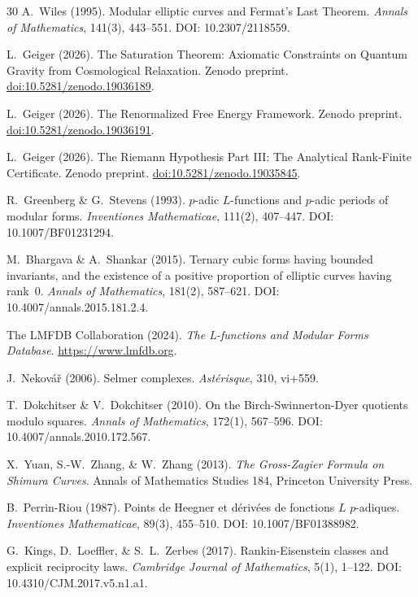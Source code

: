 \documentclass[aps,prd,twocolumn,superscriptaddress,nofootinbib]{revtex4-2}
\theoremstyle{definition}
\theoremstyle{remark}
\begin{document}
\begin{thebibliography}{30}
A.~Wiles (1995).
Modular elliptic curves and Fermat's Last Theorem.
\textit{Annals of Mathematics}, 141(3), 443--551.
DOI: 10.2307/2118559.

L.~Geiger (2026).
The Saturation Theorem: Axiomatic Constraints on Quantum Gravity from Cosmological Relaxation.
Zenodo preprint.
\href{https://doi.org/10.5281/zenodo.19036189}{doi:10.5281/zenodo.19036189}.

L.~Geiger (2026).
The Renormalized Free Energy Framework.
Zenodo preprint.
\href{https://doi.org/10.5281/zenodo.19036191}{doi:10.5281/zenodo.19036191}.

L.~Geiger (2026).
The Riemann Hypothesis Part III: The Analytical Rank-Finite Certificate.
Zenodo preprint.
\href{https://doi.org/10.5281/zenodo.19035845}{doi:10.5281/zenodo.19035845}.

R.~Greenberg \& G.~Stevens (1993).
$p$-adic $L$-functions and $p$-adic periods of modular forms.
\textit{Inventiones Mathematicae}, 111(2), 407--447.
DOI: 10.1007/BF01231294.

M.~Bhargava \& A.~Shankar (2015).
Ternary cubic forms having bounded invariants, and the existence of a positive proportion of elliptic curves having rank~0.
\textit{Annals of Mathematics}, 181(2), 587--621.
DOI: 10.4007/annals.2015.181.2.4.

The LMFDB Collaboration (2024).
\textit{The L-functions and Modular Forms Database}.
\url{https://www.lmfdb.org}.

J.~Nekov\'a\v{r} (2006).
Selmer complexes.
\textit{Ast\'erisque}, 310, vi+559.

T.~Dokchitser \& V.~Dokchitser (2010).
On the Birch-Swinnerton-Dyer quotients modulo squares.
\textit{Annals of Mathematics}, 172(1), 567--596.
DOI: 10.4007/annals.2010.172.567.

X.~Yuan, S.-W.~Zhang, \& W.~Zhang (2013).
\textit{The Gross-Zagier Formula on Shimura Curves}.
Annals of Mathematics Studies 184, Princeton University Press.

B.~Perrin-Riou (1987).
Points de Heegner et d\'eriv\'ees de fonctions $L$ $p$-adiques.
\textit{Inventiones Mathematicae}, 89(3), 455--510.
DOI: 10.1007/BF01388982.

G.~Kings, D.~Loeffler, \& S.~L.~Zerbes (2017).
Rankin-Eisenstein classes and explicit reciprocity laws.
\textit{Cambridge Journal of Mathematics}, 5(1), 1--122.
DOI: 10.4310/CJM.2017.v5.n1.a1.


\end{thebibliography}
\end{document}
